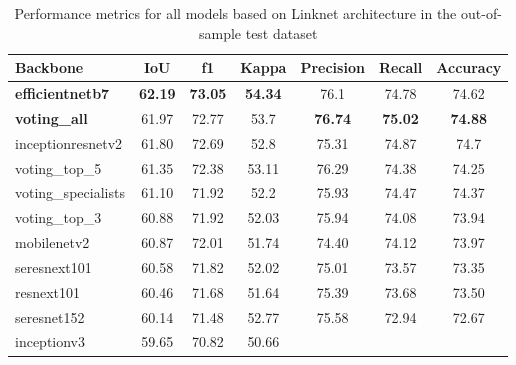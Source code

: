 \begin{table}[H]
    \centering
    \caption{Performance metrics for all models based on Linknet
        architecture in the out-of-sample test dataset}
    \label{tab:metrics-test}
    \begin{tabular}{lcccccc}
        \toprule
        Backbone                & IoU            & f1             & Kappa
                                & Precision      & Recall         &
        Accuracy
        \\
        \midrule
        \textbf{efficientnetb7} & \textbf{62.19} & \textbf{73.05} &
        \textbf{54.34}          & 76.1           & 74.78          & 74.62
        \\
        \textbf{voting\_all}    & 61.97          & 72.77          & 53.7
                                & \textbf{76.74} & \textbf{75.02} &
        \textbf{74.88}                                                    \\
        inceptionresnetv2       & 61.80          & 72.69          & 52.8
                                & 75.31          & 74.87          & 74.7
        \\
        voting\_top\_5          & 61.35          & 72.38          & 53.11
                                & 76.29          & 74.38          & 74.25
        \\
        voting\_specialists     & 61.10          & 71.92          & 52.2
                                & 75.93          & 74.47          &
        74.37
        \\
        voting\_top\_3          & 60.88          & 71.92          & 52.03
                                & 75.94          & 74.08          & 73.94
        \\
        mobilenetv2             & 60.87          & 72.01          & 51.74
                                & 74.40          & 74.12          & 73.97
        \\
        seresnext101            & 60.58          & 71.82          & 52.02
                                & 75.01          & 73.57          & 73.35
        \\
        resnext101              & 60.46          & 71.68          & 51.64
                                & 75.39          & 73.68          & 73.50
        \\
        seresnet152             & 60.14          & 71.48          & 52.77
                                & 75.58          & 72.94          & 72.67
        \\
        inceptionv3             & 59.65          & 70.82          & 50.66

\end{tabular}
\end{table}
